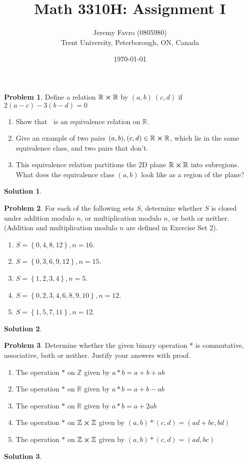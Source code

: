 \documentclass[10pt]{article}
\title{Math 3310H: Assignment I}
\author{Jeremy Favro (0805980) \\ Trent University, Peterborough, ON, Canada}
\date{\today}
\theoremstyle{definition}
\newtheorem{problem}{Problem}
\newtheorem{soln}{Solution}
\begin{document}
\maketitle

\begin{problem}
Define a relation $\mathbb{R}\cross\mathbb{R}$ by $(a,b)~(c,d)$ if $2(a-c)-3(b-d)=0$
\begin{enumerate}[label=(\alph*)]
  \item Show that $~$ is an equivalence relation on $\mathbb{R}$.
  \item Give an example of two pairs $(a,b),(c,d)\in\mathbb{R}\cross\mathbb{R}$, which lie in the same
        equivalence class, and two pairs that don't.
  \item This equivalence relation partitions the 2D plane $\mathbb{R}\cross\mathbb{R}$ into subregions.
        What does the equivalence class $(a,b)$ look like as a region of the plane?
\end{enumerate}
\end{problem}
\begin{soln}

\end{soln}

\begin{problem}
For each of the following sets $S$, determine whether $S$ is closed under
addition modulo $n$, or multiplication modulo $n$, or both or neither.
(Addition and multiplication modulo $n$ are defined in Exercise Set 2).
\begin{enumerate}[label=(\alph*)]
  \item $S=\left\{0,4,8,12\right\},n=16$.
  \item $S=\left\{0,3,6,9,12\right\},n=15$.
  \item $S=\left\{1,2,3,4\right\},n=5$.
  \item $S=\left\{0,2,3,4,6,8,9,10\right\},n=12$.
  \item $S=\left\{1,5,7,11\right\},n=12$.
\end{enumerate}
\end{problem}
\begin{soln}
\end{soln}

\begin{problem}
Determine whether the given binary operation $*$ is commutative,
associative, both or neither. Justify your answers with proof.
\begin{enumerate}[label=(\alph*)]
  \item The operation $*$ on $\mathbb{Z}$ given by $a*b=a+b+ab$
  \item The operation $*$ on $\mathbb{R}$ given by $a*b=a+b-ab$
  \item The operation $*$ on $\mathbb{R}$ given by $a*b=a+2ab$
  \item The operation $*$ on $\mathbb{Z}\cross\mathbb{Z}$ given by $(a,b)*(c,d)=(ad+bc, bd)$
  \item The operation $*$ on $\mathbb{Z}\cross\mathbb{Z}$ given by $(a,b)*(c,d)=(ad,bc)$
\end{enumerate}
\end{problem}
\begin{soln}
\end{soln}
\end{document}

